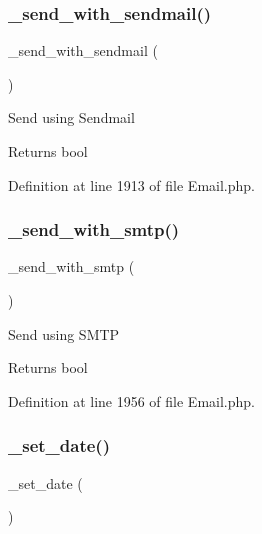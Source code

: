 \subsubsection{\texorpdfstring{\_send\_with\_sendmail()}{\_send\_with\_sendmail()}}
{\footnotesize\ttfamily \+\_\+send\+\_\+with\+\_\+sendmail (\begin{DoxyParamCaption}{ }\end{DoxyParamCaption})\hspace{0.3cm}{\ttfamily [protected]}}

Send using Sendmail

\begin{DoxyReturn}{Returns}
bool 
\end{DoxyReturn}


Definition at line 1913 of file Email.\+php.

\mbox{\label{class_c_i___email_a691e57a39f6f8956c5054fd7b109bb12}} 
\subsubsection{\texorpdfstring{\_send\_with\_smtp()}{\_send\_with\_smtp()}}
{\footnotesize\ttfamily \+\_\+send\+\_\+with\+\_\+smtp (\begin{DoxyParamCaption}{ }\end{DoxyParamCaption})\hspace{0.3cm}{\ttfamily [protected]}}

Send using S\+M\+TP

\begin{DoxyReturn}{Returns}
bool 
\end{DoxyReturn}


Definition at line 1956 of file Email.\+php.

\mbox{\label{class_c_i___email_a0c25effa0066e09273d092572709f6eb}} 
\subsubsection{\texorpdfstring{\_set\_date()}{\_set\_date()}}
{\footnotesize\ttfamily \+\_\+set\+\_\+date (\begin{DoxyParamCaption}{ }\end{DoxyParamCaption})\hspace{0.3cm}{\ttfamily [protected]}}

